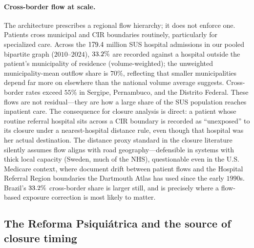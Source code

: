 \paragraph{Cross-border flow at scale.} The architecture prescribes a
regional flow hierarchy; it does not enforce one. Patients cross
municipal and CIR boundaries routinely, particularly for specialized
care. Across the $179.4$ million SUS hospital admissions in our pooled
bipartite graph ($2010$--$2024$), $33.2\%$ are recorded against a
hospital outside the patient's municipality of residence
(volume-weighted); the unweighted municipality-mean outflow share is
$70\%$, reflecting that smaller municipalities depend far more on
elsewhere than the national volume average suggests. Cross-border rates
exceed $55\%$ in Sergipe, Pernambuco, and the Distrito Federal. These
flows are not residual---they are how a large share of the SUS
population reaches inpatient care. The consequence for closure analysis
is direct: a patient whose routine referral hospital sits across a CIR
boundary is recorded as ``unexposed'' to its closure under a
nearest-hospital distance rule, even though that hospital was her actual
destination. The distance proxy standard in the closure literature
\citep{avdic2016, carroll2019, joynt2015, lindrooth2018} silently
assumes flow aligns with road geography---defensible in systems with
thick local capacity (Sweden, much of the NHS), questionable even in the
U.S. Medicare context, where \citet{wang2020hrr} document drift between
patient flows and the Hospital Referral Region boundaries the Dartmouth
Atlas has used since the early $1990$s. Brazil's $33.2\%$ cross-border
share is larger still, and is precisely where a flow-based exposure
correction is most likely to matter.

\subsection{The Reforma Psiquiátrica and the source of closure timing}
\label{sec:setting-psiquiatrica}

